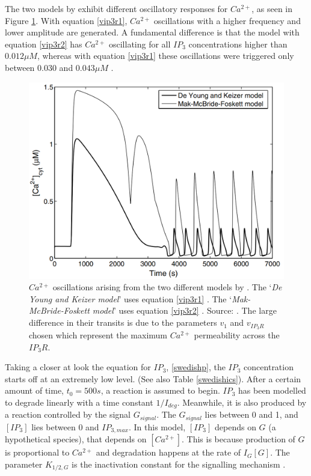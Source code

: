The two models by  exhibit different oscillatory responses for $Ca^{2+}$, as seen in Figure \ref{swedishfig}. With equation \eqref{vip3r1}, $Ca^{2+}$ oscillations with a higher frequency and lower amplitude are generated. A fundamental difference is that the model with equation \eqref{vip3r2} has $Ca^{2+}$ oscillating for all $IP_3$ concentrations higher than $0.012 \mu M$, whereas with equation \eqref{vip3r1} these oscillations were triggered only between $0.030$ and $0.043 \mu M$ \cite{swedish}. 
\begin{figure}[h!!!t!!!b!!!p]
  \centering
  \includegraphics[width=0.8\linewidth]{Chapters/4_Kowalewski_model/extras/swedishfig.png}
  \caption{$Ca^{2+}$ oscillations arising from the two different models by . The `\textit{De Young and Keizer model}' uses equation \eqref{vip3r1} \cite{deyoungkeizer}. The `\textit{Mak-McBride-Foskett model}' uses equation \eqref{vip3r2} \cite{Mak1998}. Source: . {The large difference in their transits is due to the parameters $v_1$ and $v_{IP_3R}$ chosen which represent the maximum $Ca^{2+}$ permeability across the $IP_3R$.} }\label{swedishfig}
\end{figure}

Taking a closer at look the equation for $IP_3$, \eqref{swedishp}, the $IP_3$ concentration starts off at an extremely low level. (See also Table \ref{swedishics}). After a certain amount of time, $t_0=500s$, a reaction is assumed to begin. $IP_3$ has been modelled to degrade linearly with a time constant $1/I_{deg}$. Meanwhile, it is also produced by a reaction controlled by the signal $G_{signal}$. The $G_{signal}$ lies between 0 and 1, and $[IP_3]$ lies between 0 and $IP_{3,max}$. In this model, $[IP_3]$ depends on $G$ (a hypothetical species), that depends on $[Ca^{2+}]$. This is because production of $G$ is proportional to $Ca^{2+}$ and degradation happens at the rate of $I_G[G]$. The parameter $K_{1/2,G}$ is the inactivation constant for the signalling mechanism \cite{swedish}.


